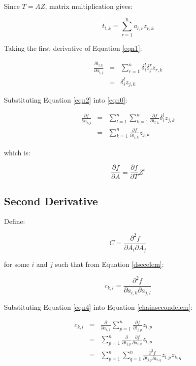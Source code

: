 \documentclass{report}
\begin{document}
\noindent Since $T=AZ$, matrix multiplication gives:

\begin{equation}
\label{eqn1}
t_{l,k} = \sum_{r=1}^n a_{l,r} z_{r,k}
\end{equation}

\noindent Taking the first derivative of Equation \ref{eqn1}:

\begin{eqnarray}
\frac{\partial t_{l,k}}{\partial a_{i,j}} 
  &=& \sum_{r=1}^n \delta_i^l \delta_j^r z_{r,k} \\
  &=& \delta_i^l z_{j,k} \label{eqn2}
\end{eqnarray}

\noindent Substituting Equation \ref{eqn2} into \ref{eqn0}:

\begin{eqnarray}
\frac{\partial f}{\partial a_{i,j}} &=& \sum_{l=1}^n \sum_{k=1}^n
 \frac{\partial f}{\partial t_{l,k}} \delta_i^l z_{j,k} \\
&=& \sum_{k=1}^{n} \frac{ \partial f}{ \partial t_{i,k}} z_{j,k} \label{eqn4}
\end{eqnarray}

\noindent which is:

\begin{equation}
\frac{\partial f}{\partial A} = \frac{\partial f}{\partial T} Z^t
\end{equation}


\subsection{Second Derivative}

Define:

\begin{equation}
C = \frac{\partial^2 f}{\partial A_i \partial A_j}
\end{equation}

\noindent for some $i$ and $j$ such that from Equation \ref{dsecelem}:

\begin{equation}
\label{chainsecondelem}
c_{k,l} = \frac{\partial^2 f}{\partial a_{i,k} \partial a_{j,l}}
\end{equation}

\noindent Substituting Equation \ref{eqn4} into Equation \ref{chainsecondelem}:

\begin{eqnarray}
c_{k,l} &=& \frac{\partial}{\partial a_{i,k}} \sum_{p=1}^n \frac{ \partial f}{\partial t_{j,p}} z_{l,p} \\
        &=& \sum_{p=1}^n \frac{\partial}{\partial t_{j,p}} \frac{\partial f}{\partial a_{i,k}} z_{l,p} \\
\label{chainsecondr1}
        &=& \sum_{p=1}^n \sum_{q=1}^n \frac{\partial^2 f}{ \partial t_{j,p} \partial t_{i,q}} z_{l,p} z_{k,q} 
\end{eqnarray}
\end{document}

